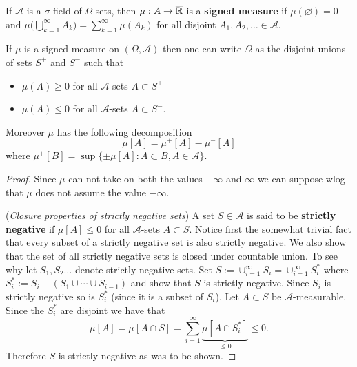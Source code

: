 \begin{shaded}
\begin{definition}
If $\mathcal A$ is a $\sigma$-field of $\Omega$-sets, then $\mu:\mathcal \mathcal A\rightarrow \overline{\Bbb R}$ is a {\bf signed measure} if $\mu(\varnothing)=0$ and  $\mu\bigl( \bigcup_{k=1}^\infty A_k \bigr)=\sum_{k=1}^\infty \mu(A_k)$ for all disjoint $A_1, A_2,\ldots \in\mathcal A$.
\end{definition}



\begin{theorem}
If $\mu$ is a signed measure on $(\Omega, \mathcal A)$ then one can write $\Omega$ as the disjoint unions of sets $S^+$ and $S^-$ such that
 \begin{itemize}
 \item $\mu(A)\geq 0$ for all $\mathcal A$-sets $A\subset S^+$
 \item $\mu(A)\leq 0$ for all $\mathcal A$-sets $A\subset S^-$.
 \end{itemize}
 Moreover $\mu$ has the following  decomposition
 \[
\mu[A] = \mu^+[A] - \mu^-[A]
 \]
where $\mu^\pm[B]= \sup\{\pm\mu[A]\colon A\subset B, A\in\mathcal A \}$.
\end{theorem}

\begin{proof}

Since $\mu$ can not take on both the values $-\infty$ and $\infty$ we can suppose wlog that $\mu$ does not assume the value $-\infty$.


({\it Closure properties of strictly negative sets}) A set $S\in \mathcal A$ is said to be {\bf strictly negative} if $\mu[A]\leq 0$ for all $\mathcal A$-sets $A\subset S$. Notice first the somewhat trivial fact  that every subset of a strictly negative set is also strictly negative.
We also show that the set of all strictly negative sets is closed under countable union. To see why let $S_1, S_2 \ldots $ denote strictly negative sets. Set $S:= \cup_{i=1}^\infty S_i = \cup_{i=1}^\infty S_i^*$ where $S_i^*:= S_i - (S_1\cup\cdots\cup S_{i-1})$ and show that $S$ is strictly negative. Since $S_i$ is strictly negative so is $S^*_i$ (since it is a subset of $S_i$). Let $A\subset S$ be $\mathcal A$-measurable. Since the $S_i^*$ are disjoint we have that
\[
\mu[A]= \mu[A\cap S] = \textstyle\sum_{i=1}^\infty \underbrace{\mu[A\cap S_i^*]}_{\leq 0} \leq 0.
\]
Therefore $S$ is strictly negative as was to be shown.


\end{proof}
\end{shaded}

